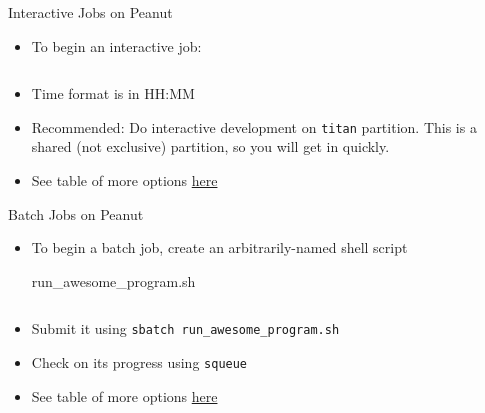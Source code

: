\documentclass{beamer}
\begin{document}
    \begin{frame}{Interactive Jobs on Peanut}
        \begin{itemize}
            \item To begin an interactive job:
            \begin{block}{}
                \inputminted{text}{src/interactive_session.sh}
            \end{block}
            \item Time format is in HH:MM
            \item Recommended: Do interactive development on \texttt{titan} partition.  This is a shared (not exclusive) partition, so you will get in quickly.
            \item See table of more options \href{https://paper.dropbox.com/doc/MPCS-51087-Peanut-Guide--BEH4QScOO4aUHCdYBIXHJTuOAQ-H2Qv2MChSshxwVqF7cuFH}{here}
        \end{itemize}
    \end{frame}
    
    \begin{frame}{Batch Jobs on Peanut}
        \begin{itemize}
            \item To begin a batch job, create an arbitrarily-named shell script
            \begin{block}{run\_awesome\_program.sh}
                \inputminted{shell}{src/batch.sh}
            \end{block}
            \item Submit it using \texttt{sbatch run\_awesome\_program.sh}
            \item Check on its progress using \texttt{squeue}
            \item See table of more options \href{https://paper.dropbox.com/doc/MPCS-51087-Peanut-Guide--BEH4QScOO4aUHCdYBIXHJTuOAQ-H2Qv2MChSshxwVqF7cuFH}{here}
        \end{itemize}
    \end{frame}

\end{document}
